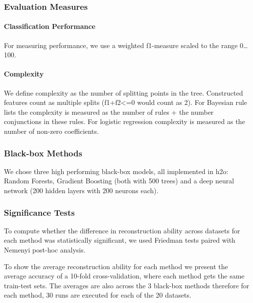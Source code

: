 \subsubsection{Evaluation Measures}
\paragraph{Classification Performance}
For measuring performance, we use a weighted f1-measure scaled to the range 0\ldots100.
\paragraph{Complexity}
We define complexity as the number of splitting points in the tree. Constructed features count as multiple splits (f1+f2<=0 would count as 2). For Bayesian rule lists the complexity is measured as the number of rules + the number conjunctions in these rules. For logistic regression complexity is measured as the number of non-zero coefficients.
\subsubsection{Black-box Methods}
We chose three high performing black-box models, all implemented in h2o: Random Forests, Gradient Boosting (both with 500 trees) and a deep neural network (200 hidden layers with 200 neurons each).

\subsubsection{Significance Tests}
To compute whether the difference in reconstruction ability across datasets for each method was statistically significant, we used Friedman tests paired with Nemenyi post-hoc analysis. 

To show the average reconstruction ability for each method we present the average accuracy of a 10-fold cross-validation, where each method gets the same train-test sets. The averages are also across the 3 black-box methods therefore for each method, 30 runs are executed for each of the 20 datasets.
